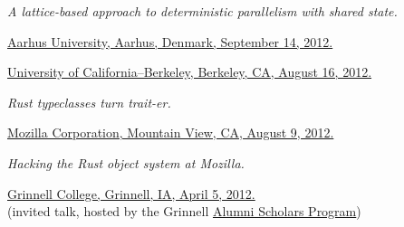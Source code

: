 \documentclass[10pt,letterpaper]{article}
\newenvironment{itemize*}
  {\begin{itemize}
      \setlength{\itemsep}{1pt}
      \setlength{\parskip}{3pt}
  }
  {\end{itemize}}
\begin{document}
\begin{itemize*}
\item
  \emph{A lattice-based approach to deterministic parallelism with
    shared state.}
  \begin{itemize*}
    \item
      \href{http://www.cs.indiana.edu/~lkuper/talks/monotonic-determinism/monotonic-determinism-aarhus-2012.pdf}{Aarhus
        University, Aarhus, Denmark, September 14, 2012.}
    \item
      \href{http://www.cs.indiana.edu/~lkuper/talks/monotonic-determinism/monotonic-determinism-berkeley-2012.pdf}{University
        of California--Berkeley, Berkeley, CA, August 16, 2012.}
  \end{itemize*}

\item \emph{Rust typeclasses turn trait-er.}
  \begin{itemize*}
  \item \href{http://www.cs.indiana.edu/~lkuper/talks/rust-traits/typeclasses-turn-trait-er-mozilla.pdf}{Mozilla
    Corporation, Mountain View, CA, August 9, 2012.}
  \end{itemize*}

\item \emph{Hacking the Rust object system at Mozilla.}
  \begin{itemize*}
  \item
    \href{http://www.cs.indiana.edu/~lkuper/talks/rust-objects/rust-objects-grinnell.pdf}{Grinnell
      College, Grinnell, IA, April 5, 2012.} \\ 
    (invited talk, hosted by the Grinnell
    \href{http://www.grinnell.edu/offices/dean/alumscholars/}{Alumni
      Scholars Program})
  \end{itemize*}



\end{itemize*}
\end{document}

